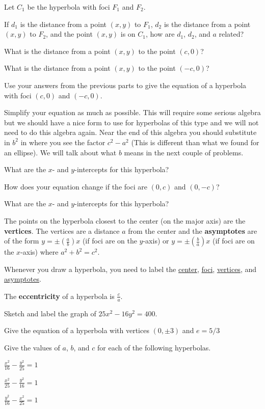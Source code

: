 \bq Let $C_1$ be the hyperbola with foci $F_1$ and $F_2$.
\be
\item If $d_1$ is the distance from a point $(x,y)$ to $F_1$, $d_2$ is the distance from a point $(x,y)$ to $F_2$, and the point $(x,y)$ is on $C_1$, how are $d_1$, $d_2$, and $a$ related?
\item What is the distance from a point $(x,y)$ to the point $(c,0)$?
\item What is the distance from a point $(x,y)$ to the point $(-c,0)$?
\item Use your answers from the previous parts to give the equation of a hyperbola with foci $(c,0)$ and $(-c,0)$.
\item Simplify your equation as much as possible. This will require some serious algebra but we should have a nice form to use for hyperbolas of this type and we will not need to do this algebra again. Near the end of this algebra you should substitute in $b^2$ in where you see the factor $c^2-a^2$ (This is different than what we found for an ellipse). We will talk about what $b$ means in the next couple of problems.
\item What are the $x$- and $y$-intercepts for this hyperbola?
\ee \eq

\bq \be
\item How does your equation change if the foci are $(0,c)$ and $(0,-c)$?
\item What are the $x$- and $y$-intercepts for this hyperbola?
\ee \eq

\begin{info}
The points on the hyperbola closest to the center (on the major axis) are the \textbf{vertices}. The vertices are a distance $a$ from the center and the \textbf{asymptotes} are of the form $y=\pm(\frac{a}{b}) x$ (if foci are on the $y$-axis) or $y=\pm(\frac{b}{a}) x$ (if foci are on the $x$-axis) where $a^2+b^2=c^2$.

Whenever you draw a hyperbola, you need to label the \underline{center}, \underline{foci}, \underline{vertices}, and \underline{asymptotes}.

The \textbf{eccentricity} of a hyperbola is $\frac{c}{a}$. \end{info}

\bq Sketch and label the graph of $25x^2-16y^2=400$. \eq

\bq Give the equation of a hyperbola with vertices $(0,\pm3)$ and $e=5/3$ \eq

\bq Give the values of $a$, $b$, and $c$ for each of the following hyperbolas.
\be
\item $\frac{x^2}{16}-\frac{y^2}{25}=1$
\item $\frac{x^2}{25}-\frac{y^2}{16}=1$
\item $\frac{y^2}{16}-\frac{x^2}{25}=1$
\ee
\eq

